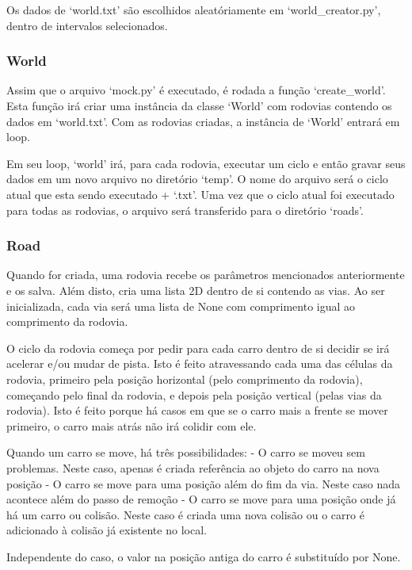 \documentclass{article}
\begin{document}
    Os dados de `world.txt' são escolhidos aleatóriamente em `world\_creator.py', dentro de intervalos selecionados.

    \subsubsection{World}
    Assim que o arquivo `mock.py' é executado, é rodada a função `create\_world'. Esta função irá criar uma instância
    da classe `World' com rodovias contendo os dados em `world.txt'. Com as rodovias criadas, a instância de `World'
    entrará em loop.

    Em seu loop, `world' irá, para cada rodovia, executar um ciclo e então gravar seus dados em um novo arquivo no
    diretório `temp'. O nome do arquivo será o ciclo atual que esta sendo executado + `.txt'. Uma vez que o ciclo
    atual foi executado para todas as rodovias, o arquivo será transferido para o diretório `roads'.


    \subsubsection{Road}
    Quando for criada, uma rodovia recebe os parâmetros mencionados anteriormente e os salva. Além disto, cria
    uma lista 2D dentro de si contendo as vias. Ao ser inicializada, cada via será uma lista de None com comprimento
    igual ao comprimento da rodovia.

    O ciclo da rodovia começa por pedir para cada carro dentro de si decidir se irá acelerar e/ou mudar de pista.
    Isto é feito atravessando cada uma das células da rodovia, primeiro pela posição horizontal (pelo comprimento
    da rodovia), começando pelo final da rodovia, e depois pela posição vertical (pelas vias da rodovia). Isto é
    feito porque há casos em que se o carro mais a frente se mover primeiro, o carro mais atrás não irá colidir com
    ele.

    Quando um carro se move, há três possibilidades:
    - O carro se moveu sem problemas. Neste caso, apenas é criada referência ao objeto do carro na nova posição
    - O carro se move para uma posição além do fim da via. Neste caso nada acontece além do passo de remoção
    - O carro se move para uma posição onde já há um carro ou colisão. Neste caso é  criada uma nova colisão ou o
    carro é adicionado à colisão já existente no local.
    
    Independente do caso, o valor na posição antiga do carro é substituído por None.
    
\end{document}
